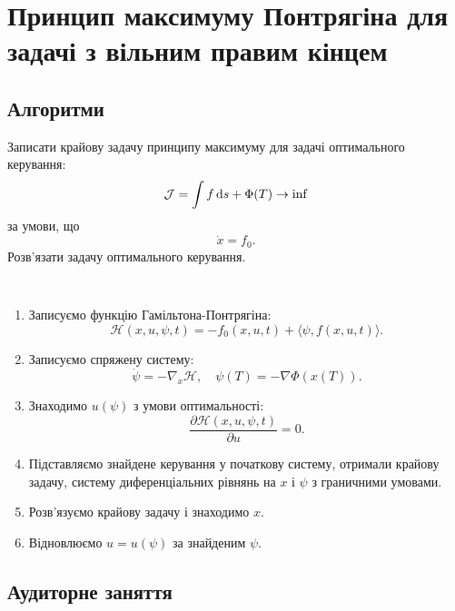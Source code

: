 \section{Принцип максимуму Понтрягіна для задачі з вільним правим кінцем}

\subsection{Алгоритми}

\begin{problem*}
    Записати крайову задачу принципу максимуму для задачі оптимального керування: \[ \mathcal{J} = \int f \mathop{}\!\mathrm{d} s + \Phi(T) \to \inf \] за умови, що \[ \dot x = f_0. \] Розв'язати задачу оптимального керування.
\end{problem*}

\begin{algorithm} \tt
    \begin{enumerate}
        \item Записуємо функцію Гамільтона-Понтрягіна: \[ \mathcal{H} (x, u, \psi, t) = - f_0(x, u, t) + \langle \psi, f(x, u, t) \rangle. \]
    
        \item Записуємо спряжену систему: \[ \dot \psi = - \nabla_x \mathcal{H}, \quad \psi(T) = - \nabla \Phi(x(T)). \]
    
    
        \item Знаходимо $u(\psi)$ з умови оптимальності: \[ \dfrac{\partial \mathcal{H}(x, u, \psi, t)}{\partial u} = 0. \]

        \item Підставляємо знайдене керування у початкову систему, от\-ри\-ма\-ли \allowbreak край\-о\-ву задачу, систему диференціальних рівнянь на $x$ і $\psi$ з гра\-нич\-ни\-ми  \allowbreak у\-мо\-ва\-ми.

        \item Розв'язуємо крайову задачу і знаходимо $x$.

        \item Відновлюємо $u = u (\psi)$ за знайденим $\psi$.
    \end{enumerate}
\end{algorithm}

\newpage

\subsection{Аудиторне заняття}

